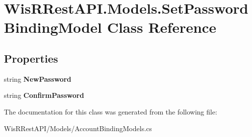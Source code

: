 \hypertarget{class_wis_r_rest_a_p_i_1_1_models_1_1_set_password_binding_model}{}\section{Wis\+R\+Rest\+A\+P\+I.\+Models.\+Set\+Password\+Binding\+Model Class Reference}
\label{class_wis_r_rest_a_p_i_1_1_models_1_1_set_password_binding_model}
\subsection*{Properties}
\begin{DoxyCompactItemize}
\item 
\hypertarget{class_wis_r_rest_a_p_i_1_1_models_1_1_set_password_binding_model_acf9370a591034d1869903f016335abc2}{}string {\bfseries New\+Password}\label{class_wis_r_rest_a_p_i_1_1_models_1_1_set_password_binding_model_acf9370a591034d1869903f016335abc2}

\item 
\hypertarget{class_wis_r_rest_a_p_i_1_1_models_1_1_set_password_binding_model_a05dc3ba7f32f41607fcb1424cf7cc766}{}string {\bfseries Confirm\+Password}\label{class_wis_r_rest_a_p_i_1_1_models_1_1_set_password_binding_model_a05dc3ba7f32f41607fcb1424cf7cc766}

\end{DoxyCompactItemize}


The documentation for this class was generated from the following file\+:\begin{DoxyCompactItemize}
\item 
Wis\+R\+Rest\+A\+P\+I/\+Models/Account\+Binding\+Models.\+cs\end{DoxyCompactItemize}
